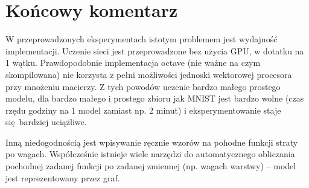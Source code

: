 \documentclass[a4paper]{article}
\begin{document}
% 
% 
% 
% 
% 
% 
% 
% 
% 


\section{Końcowy komentarz}

W przeprowadzonych eksperymentach istotym problemem jest wydajność implementacji.
Uczenie sieci jest przeprowadzone bez użycia GPU, w dotatku na 1 wątku. 
Prawdopodobnie implementacja octave (nie ważne na czym skompilowana)
nie korzysta z pełni możliwości jednoski wektorowej procesora przy mnożeniu macierzy.
Z tych powodów uczenie bardzo małego prostego modelu,
dla bardzo małego i prostego zbioru jak MNIST jest bardzo wolne
(czas rzędu godziny na 1 model zamiast np. 2 minut)
i eksperymentowanie staje się bardziej uciążliwe.

Inną niedogodnością jest wpisywanie ręcznie wzorów na pohodne funkcji straty po wagach.
Współcześnie istnieje wiele narzędzi do automatycznego obliczania pochodnej
zadanej funkcji po zadanej zmiennej (np. wagach warstwy) --
model jest reprezentowany przez graf.
\end{document}
